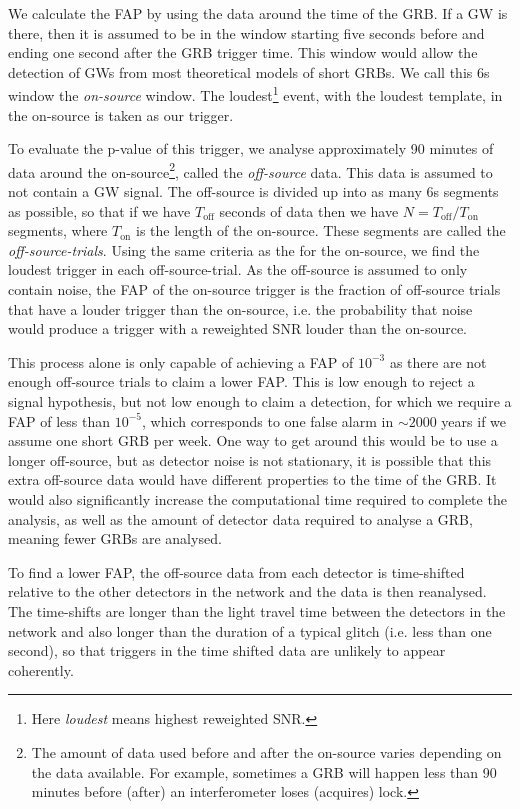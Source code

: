 \documentclass[11pt]{cuthesis}
\begin{document}
We calculate the FAP by using the data around the time of the GRB. If a GW is there, then it is assumed to be in the window starting five seconds before and ending one second after the GRB trigger time. This window would allow the detection of GWs from most theoretical models of short GRBs. \cite{lee_2007,vedrenne_gamma-ray} We call this 6s window the \textit{on-source} window. The loudest\footnote{Here \textit{loudest} means highest reweighted SNR.} event, with the loudest template, in the on-source is taken as our trigger. 

To evaluate the p-value of this trigger, we analyse approximately 90 minutes of data around the on-source\footnote{The amount of data used before and after the on-source varies depending on the data available. For example, sometimes a GRB will happen less than 90 minutes before (after) an interferometer loses (acquires) lock.}, called the \textit{off-source} data. This data is assumed to not contain a GW signal. The off-source is divided up into as many 6s segments as possible, so that if we have $T_\text{off}$ seconds of data then we have $N=T_\text{off} / T_\text{on}$ segments, where $T_\text{on}$ is the length of the on-source. These segments are called the \textit{off-source-trials}. Using the same criteria as the for the on-source, we find the loudest trigger in each off-source-trial. As the off-source is assumed to only contain noise, the FAP of the on-source trigger is the fraction of off-source trials that have a louder trigger than the on-source, i.e. the probability that noise would produce a trigger with a reweighted SNR louder than the on-source. 

This process alone is only capable of achieving a FAP of $10^{-3}$ as there are not enough off-source trials to claim a lower FAP. This is low enough to reject a signal hypothesis, but not low enough to claim a detection, for which we require a FAP of less than $10^{-5}$, \cite{pygrb_Williamson:2014} which corresponds to one false alarm in $\sim2000$ years if we assume one short GRB per week. One way to get around this would be to use a longer off-source, but as detector noise is not stationary, it is possible that this extra off-source data would have different properties to the time of the GRB. It would also significantly increase the computational time required to complete the analysis, as well as the amount of detector data required to analyse a GRB, meaning fewer GRBs are analysed.

To find a lower FAP, the off-source data from each detector is time-shifted relative to the other detectors in the network and the data is then reanalysed. The time-shifts are longer than the light travel time between the detectors in the network and also longer than the duration of a typical glitch (i.e. less than one second), so that triggers in the time shifted data are unlikely to appear coherently.  
\end{document}
